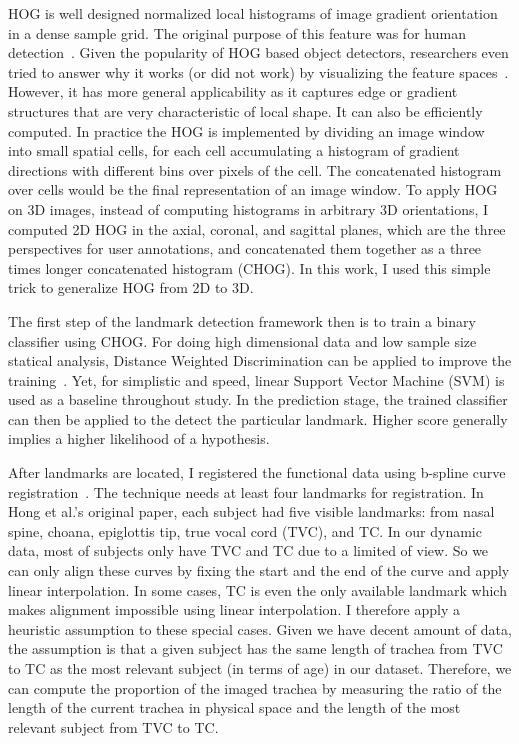 HOG is well designed normalized local histograms of image gradient orientation in a dense sample grid.
The original purpose of this feature was for human detection~\cite{dalal2005histograms}.
Given the popularity of HOG based object detectors, researchers even tried to answer why it works (or did not work) by visualizing the feature spaces~\cite{vondrick2013hoggles}.
However, it has more general applicability as it captures edge or gradient structures that are very characteristic of local shape. 
It can also be efficiently computed.
In practice the HOG is implemented by dividing an image window into small spatial cells, for each cell accumulating a histogram of gradient directions with different bins over pixels of the cell.
The concatenated histogram over cells would be the final representation of an image window. 
To apply HOG on 3D images, instead of computing histograms in arbitrary 3D orientations, I computed 2D HOG in the axial, coronal, and sagittal planes, which are the three perspectives for user annotations, and concatenated them together as a three times longer concatenated histogram (CHOG).
In this work, I used this simple trick to generalize HOG from 2D to 3D.

The first step of the landmark detection framework then is to train a binary classifier using CHOG.
For doing high dimensional data and low sample size statical analysis, Distance Weighted Discrimination can be applied to improve the training~\cite{marron2007distance}.
Yet, for simplistic and speed, linear Support Vector Machine (SVM) is used as a baseline throughout study.
In the prediction stage, the trained classifier can then be applied to the detect the particular landmark.
Higher score generally implies a higher likelihood of a hypothesis.

After landmarks are located, I registered the functional data using b-spline curve registration~\cite{ramsay2006functional}.
The technique needs at least four landmarks for registration.
In Hong et al.'s original paper, each subject had five visible landmarks: from nasal spine, choana, epiglottis tip, true vocal cord (TVC), and TC.
In our dynamic data, most of subjects only have TVC and TC due to a limited of view.
So we can only align these curves by fixing the start and the end of the curve and apply linear interpolation.
In some cases, TC is even the only available landmark which makes alignment impossible using linear interpolation.
I therefore apply a heuristic assumption to these special cases.
Given we have decent amount of data,
the assumption is that a given subject has the same length of trachea from TVC to TC as the most relevant subject (in terms of age) in our dataset.
Therefore, we can compute the proportion of the imaged trachea by measuring the ratio of the length of the current trachea in physical space and the length of the most relevant subject from TVC to TC.

